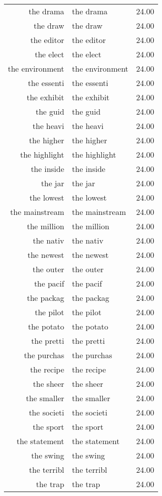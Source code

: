 \begin{table}[ht]
\begin{tabular}{rlr}
  the drama & the drama & 24.00 \\ 
  the draw & the draw & 24.00 \\ 
  the editor & the editor & 24.00 \\ 
  the elect & the elect & 24.00 \\ 
  the environment & the environment & 24.00 \\ 
  the essenti & the essenti & 24.00 \\ 
  the exhibit & the exhibit & 24.00 \\ 
  the guid & the guid & 24.00 \\ 
  the heavi & the heavi & 24.00 \\ 
  the higher & the higher & 24.00 \\ 
  the highlight & the highlight & 24.00 \\ 
  the inside & the inside & 24.00 \\ 
  the jar & the jar & 24.00 \\ 
  the lowest & the lowest & 24.00 \\ 
  the mainstream & the mainstream & 24.00 \\ 
  the million & the million & 24.00 \\ 
  the nativ & the nativ & 24.00 \\ 
  the newest & the newest & 24.00 \\ 
  the outer & the outer & 24.00 \\ 
  the pacif & the pacif & 24.00 \\ 
  the packag & the packag & 24.00 \\ 
  the pilot & the pilot & 24.00 \\ 
  the potato & the potato & 24.00 \\ 
  the pretti & the pretti & 24.00 \\ 
  the purchas & the purchas & 24.00 \\ 
  the recipe & the recipe & 24.00 \\ 
  the sheer & the sheer & 24.00 \\ 
  the smaller & the smaller & 24.00 \\ 
  the societi & the societi & 24.00 \\ 
  the sport & the sport & 24.00 \\ 
  the statement & the statement & 24.00 \\ 
  the swing & the swing & 24.00 \\ 
  the terribl & the terribl & 24.00 \\ 
  the trap & the trap & 24.00 \\ 

\end{tabular}
\end{table}

